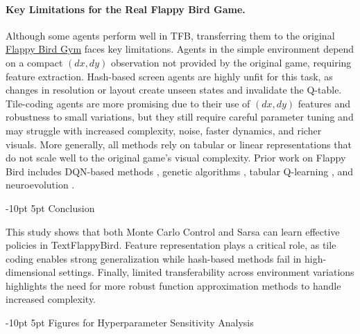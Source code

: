 \documentclass[runningheads]{llncs}
\makeatletter
\renewcommand\section{\@startsection{section}{1}{\z@}%
  {-10pt \@plus -3pt \@minus -3pt}%
  {5pt \@plus 5pt}%
  {\normalfont\large\bfseries}}
\makeatother
\begin{document}
\paragraph{Key Limitations for the Real Flappy Bird Game.}
Although some agents perform well in TFB, transferring them to the original \href{https://github.com/Talendar/flappy-bird-gym}{Flappy Bird Gym} faces key limitations. Agents in the simple environment depend on a compact $(dx, dy)$ observation not provided by the original game, requiring feature extraction. Hash-based screen agents are highly unfit for this task, as changes in resolution or layout create unseen states and invalidate the Q-table. Tile-coding agents are more promising due to their use of $(dx, dy)$ features and robustness to small variations, but they still require careful parameter tuning and may struggle with increased complexity, noise, faster dynamics, and richer visuals. More generally, all methods rely on tabular or linear representations that do not scale well to the original game's visual complexity. Prior work on Flappy Bird includes DQN-based methods \cite{appiah2018playing,chen2015deep}, genetic algorithms \cite{gan2022flappy}, tabular Q-learning \cite{vu2020flapai}, and neuroevolution \cite{brandao2019reinforcement}.

\section{Conclusion}

This study shows that both Monte Carlo Control and Sarsa can learn effective policies in TextFlappyBird. Feature representation plays a critical role, as tile coding enables strong generalization while hash-based methods fail in high-dimensional settings. Finally, limited transferability across environment variations highlights the need for more robust function approximation methods to handle increased complexity.

{\footnotesize


}

\clearpage
\appendix

\section{Figures for Hyperparameter Sensitivity Analysis}
\end{document}
